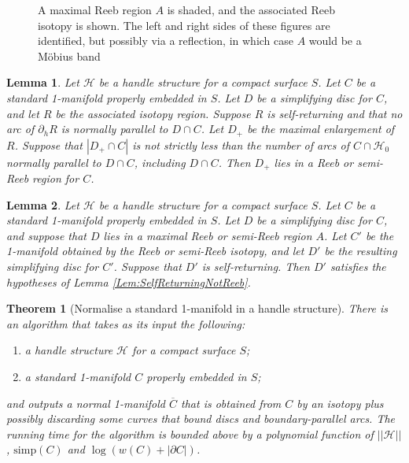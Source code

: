 \documentclass[10pt,a4paper]{amsart}
\newtheorem{theorem}{Theorem}
\newtheorem{lemma}{Lemma}
\newcommand{\calH}{\mathcal{H}}
\begin{document}
\begin{figure}[h]
\centering

\caption{A maximal Reeb region $A$ is shaded, and the associated Reeb isotopy is shown. The left and right sides of these figures are identified, but possibly via a reflection, in which case $A$ would be a M\"obius band}
\label{Fig:ReebRegion}
\end{figure}

\begin{lemma}
\label{Lem:ReebConclusion}
Let $\calH$ be a handle structure for a compact surface $S$. Let $C$ be a standard 1-manifold properly embedded in $S$. Let $D$ be a simplifying disc for $C$, and let $R$ be the associated isotopy region. Suppose $R$ is self-returning and that no arc of $\partial_hR$ is normally parallel to $D \cap C$. Let $D_+$ be the maximal enlargement of $R$. Suppose that $|D_+ \cap C|$ is not strictly less than the number of arcs of $C \cap \calH_0$ normally parallel to $D \cap C$, including $D \cap C$. Then $D_+$ lies in a Reeb or semi-Reeb region for $C$.
\end{lemma}

\begin{lemma}
\label{Lem:ReebIsotopy}
Let $\calH$ be a handle structure for a compact surface $S$. Let $C$ be a standard 1-manifold properly embedded in $S$. Let $D$ be a simplifying disc for $C$, and suppose that $D$ lies in a maximal Reeb or semi-Reeb region $A$. Let $C'$ be the 1-manifold obtained by the Reeb or semi-Reeb isotopy, and let $D'$ be the resulting simplifying disc for $C'$. Suppose that $D'$ is self-returning. Then $D'$ satisfies the hypotheses of Lemma \ref{Lem:SelfReturningNotReeb}.
\end{lemma}

\begin{theorem}[{\sc Normalise a standard 1-manifold in a handle structure}]
\label{Thm:Normalise1Manifold}
There is an algorithm that takes as its input the following:
\begin{enumerate}
\item a handle structure $\calH$ for a compact surface $S$;
\item a standard 1-manifold $C$ properly embedded in $S$;
\end{enumerate}
and outputs a normal 1-manifold $\overline{C}$ that is obtained from $C$ by an isotopy plus possibly discarding some curves that bound discs and boundary-parallel arcs. The running time for the algorithm is bounded above by a polynomial function of $||\calH||$, $\mathrm{simp}(C)$ and $\log (w(C) + |\partial C|)$.
\end{theorem}
\end{document}
